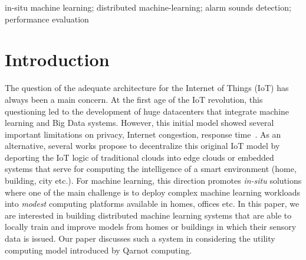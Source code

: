 \documentclass[10pt, conference, compsocconf]{IEEEtran}
\begin{document}
\begin{IEEEkeywords}
in-situ machine learning; distributed machine-learning; alarm sounds detection;  performance evaluation

\end{IEEEkeywords}


%
\IEEEpeerreviewmaketitle


\section{Introduction} \label{Introduction}

The question of the adequate architecture for the Internet of Things (IoT) has always been a main concern. At the first age of the 
IoT revolution, this questioning led to the development of huge datacenters that integrate machine learning and Big Data systems. 
However, this initial model showed several important limitations on privacy, Internet congestion, 
response time~\cite{DBLP:conf/lcn/Roelands13}. As an alternative, several works propose to decentralize this original IoT model by deporting the IoT logic of traditional clouds into edge clouds or embedded systems that serve for computing the intelligence of a smart environment (home, building, city etc.). For machine learning, 
this direction promotes {\it in-situ} solutions where one of the main challenge is to deploy complex machine learning 
workloads into {\it modest} computing platforms available in homes, offices etc. In this paper, we are interested in building distributed machine learning 
systems that are able to locally train and improve models from homes or buildings in which their sensory data is issued. 
Our paper discusses such a system in considering the utility computing model introduced by 
Qarnot computing. 
\end{document}
